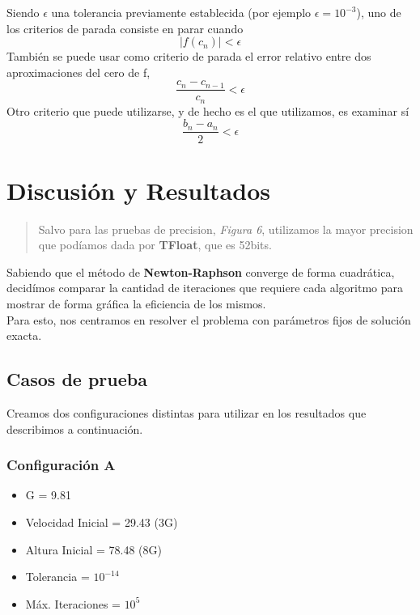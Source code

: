 \documentclass[a4paper]{article}
\begin{document}
Siendo $\epsilon$ una tolerancia previamente establecida (por ejemplo $\epsilon = 10^{-3}$), uno de los criterios de parada consiste en parar cuando 
\begin{equation}|f(c_n)| < \epsilon \end{equation}
También se puede usar como criterio de parada el error relativo entre dos aproximaciones del cero de f, 
\begin{equation}\frac{c_n - c_{n-1}}{c_n} < \epsilon \end{equation}
Otro criterio que puede utilizarse, y de hecho es el que utilizamos, es examinar sí \begin{equation}\frac{b_n - a_n}{2} < \epsilon\end{equation}

\newpage
\section{Discusión y Resultados}
\begin{quote}
Salvo para las pruebas de precision, \textit{Figura 6}, utilizamos la mayor precision que podíamos dada por \textbf{TFloat}, que es 52bits.
\end{quote}
\vspace{1em}

Sabiendo que el método de \textbf{Newton-Raphson} converge de forma cuadrática, decidímos comparar la cantidad de iteraciones que requiere cada algoritmo para mostrar de forma gráfica la eficiencia de los mismos. \\

Para esto, nos centramos en resolver el problema con parámetros fijos de solución exacta.

\subsection{Casos de prueba}
 Creamos dos configuraciones distintas para utilizar en los resultados que describimos a continuación.


\subsubsection{Configuración A} 
\begin{itemize}
  \item{G = 9.81}
  \item{Velocidad Inicial = 29.43 (3G)} 
  \item{Altura Inicial = 78.48 (8G)} 
  \item{Tolerancia = $10^{-14}$} 
  \item{Máx. Iteraciones = $10^5$}
\end{itemize}
\end{document}
